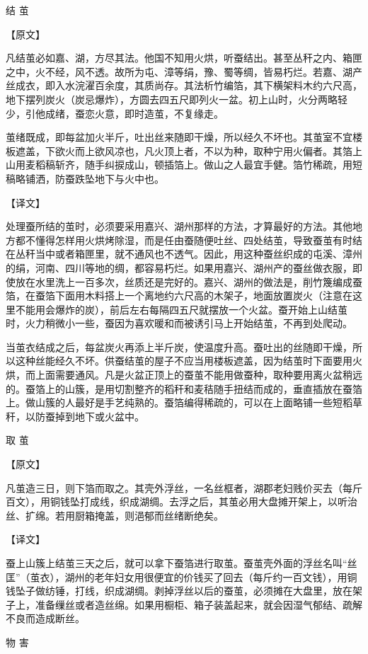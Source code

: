 \documentclass[12pt,UTF8]{ctexbook}
\begin{document}
结 茧

【原文】

凡结茧必如嘉、湖，方尽其法。他国不知用火烘，听蚕结出。甚至丛秆之内、箱匣之中，火不经，风不透。故所为屯、漳等绢，豫、蜀等绸，皆易朽烂。若嘉、湖产丝成衣，即入水浣濯百余度，其质尚存。其法析竹编箔，其下横架料木约六尺高，地下摆列炭火（炭忌爆炸），方圆去四五尺即列火一盆。初上山时，火分两略轻少，引他成绪，蚕恋火意，即时造茧，不复缘走。

茧绪既成，即每盆加火半斤，吐出丝来随即干燥，所以经久不坏也。其茧室不宜楼板遮盖，下欲火而上欲风凉也，凡火顶上者，不以为种，取种宁用火偏者。其箔上山用麦稻稿斩齐，随手纠捩成山，顿插箔上。做山之人最宜手健。箔竹稀疏，用短稿略铺洒，防蚕跌坠地下与火中也。

【译文】

处理蚕所结的茧时，必须要采用嘉兴、湖州那样的方法，才算最好的方法。其他地方都不懂得怎样用火烘烤除湿，而是任由蚕随便吐丝、四处结茧，导致蚕茧有时结在丛秆当中或者箱匣里，就不通风也不透气。因此，用这种蚕丝织成的屯溪、漳州的绢，河南、四川等地的绸，都容易朽烂。如果用嘉兴、湖州产的蚕丝做衣服，即使放在水里洗上一百多次，丝质还是完好的。嘉兴、湖州的做法是，削竹篾编成蚕箔，在蚕箔下面用木料搭上一个离地约六尺高的木架子，地面放置炭火（注意在这里不能用会爆炸的炭），前后左右每隔四五尺就摆放一个火盆。蚕开始上山结茧时，火力稍微小一些，蚕因为喜欢暖和而被诱引马上开始结茧，不再到处爬动。

当茧衣结成之后，每盆炭火再添上半斤炭，使温度升高。蚕吐出的丝随即干燥，所以这种丝能经久不坏。供蚕结茧的屋子不应当用楼板遮盖，因为结茧时下面要用火烘，而上面需要通风。凡是火盆正顶上的蚕茧不能用做蚕种，取种要用离火盆稍远的。蚕箔上的山簇，是用切割整齐的稻秆和麦秸随手扭结而成的，垂直插放在蚕箔上。做山簇的人最好是手艺纯熟的。蚕箔编得稀疏的，可以在上面略铺一些短稻草秆，以防蚕掉到地下或火盆中。

取 茧

【原文】

凡茧造三日，则下箔而取之。其壳外浮丝，一名丝框者，湖郡老妇贱价买去（每斤百文），用铜钱坠打成线，织成湖绸。去浮之后，其茧必用大盘摊开架上，以听治丝、扩绵。若用厨箱掩盖，则浥郁而丝绪断绝矣。

【译文】

蚕上山簇上结茧三天之后，就可以拿下蚕箔进行取茧。蚕茧壳外面的浮丝名叫“丝匡”（茧衣），湖州的老年妇女用很便宜的价钱买了回去（每斤约一百文钱），用铜钱坠子做纺锤，打线，织成湖绸。剥掉浮丝以后的蚕茧，必须摊在大盘里，放在架子上，准备缫丝或者造丝绵。如果用橱柜、箱子装盖起来，就会因湿气郁结、疏解不良而造成断丝。

物 害
\end{document}

